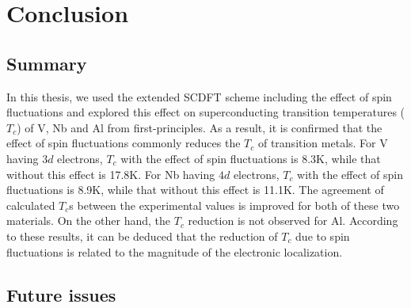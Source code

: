 

%
%
\chapter{Conclusion}
\label{conclusion}

\section{Summary}
In this thesis, we used the extended SCDFT scheme including the effect of spin fluctuations
and explored this effect on superconducting transition temperatures ($T_c$)
of V, Nb and Al from first-principles. 
As a result, it is confirmed that the effect of spin fluctuations commonly
reduces the $T_c$ of transition metals. 
For V having $3d$ electrons, $T_c$ with the effect of spin fluctuations is 8.3K, while that 
without this effect is 17.8K.
For Nb having $4d$ electrons, $T_c$ with the effect of spin fluctuations is 8.9K, while that 
without this effect is 11.1K.
The agreement of calculated $T_c$s between the experimental values is improved for both of these 
two materials. On the other hand, the $T_c$ reduction is not observed for Al.
According to these results, it can be deduced that the reduction of $T_c$ due to spin fluctuations
is related to the magnitude of the electronic localization.

\section{Future issues}

